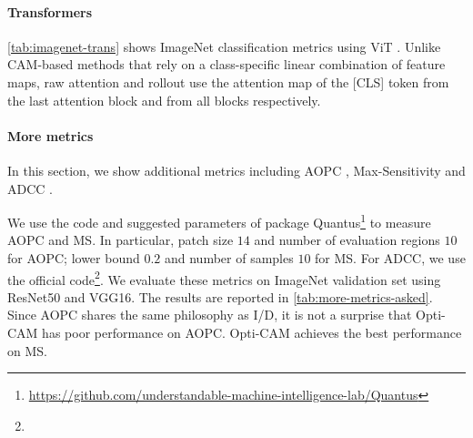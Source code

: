

\paragraph{Transformers}

\autoref{tab:imagenet-trans} shows ImageNet classification metrics using ViT . 
Unlike CAM-based methods that rely on a class-specific linear combination of feature maps, 
raw attention \autocite{dosovitskiy2020image} and rollout \autocite{abnar2020quantifying} use the 
attention map of the [CLS] token from the last attention block and from all blocks respectively. 

\paragraph{More metrics}
In this section, we show additional metrics including AOPC \autocite{samek2016evaluating}, Max-Sensitivity
 \autocite{yeh2019fidelity} and ADCC \autocite{poppi2021revisiting}.

We use the code and suggested parameters of package 
Quantus\footnote{\url{https://github.com/understandable-machine-intelligence-lab/Quantus}} to measure AOPC 
and MS. In particular, patch size $14$ and number of evaluation regions $10$ for AOPC; lower bound $0.2$ 
and number of samples $10$ for MS.
For ADCC, we use the official 
code\footnote{}.
We evaluate these metrics on ImageNet validation set using ResNet50 and VGG16. The results are 
reported in \autoref{tab:more-metrics-asked}. Since AOPC shares the same philosophy as I/D, it is 
not a surprise that Opti-CAM has poor performance on AOPC. Opti-CAM achieves the best performance on MS.


